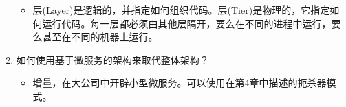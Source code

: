 \begin{enumerate}
\begin{itemize}
\item 
层(Layer)是逻辑的，并指定如何组织代码。层(Tier)是物理的，它指定如何运行代码。每一层都必须由其他层隔开，要么在不同的进程中运行，要么甚至在不同的机器上运行。
\end{itemize}

\item
如何使用基于微服务的架构来取代整体架构？

\begin{itemize}
\item 
增量，在大公司中开辟小型微服务。可以使用在第4章中描述的扼杀器模式。
\end{itemize}
\end{enumerate}